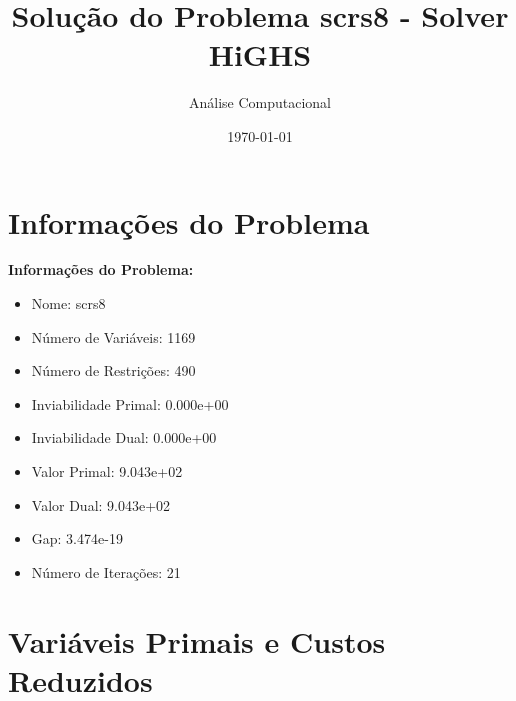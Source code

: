 \documentclass[12pt]{article}
\title{Solução do Problema scrs8 - Solver HiGHS}
\author{Análise Computacional}
\date{\today}
\begin{document}
\maketitle

\section{Informações do Problema}

\textbf{Informações do Problema:}
\begin{itemize}
\item Nome: scrs8
\item Número de Variáveis: 1169
\item Número de Restrições: 490
\item Inviabilidade Primal: 0.000e+00
\item Inviabilidade Dual: 0.000e+00
\item Valor Primal: 9.043e+02
\item Valor Dual: 9.043e+02
\item Gap: 3.474e-19
\item Número de Iterações: 21
\end{itemize}


\section{Variáveis Primais e Custos Reduzidos}
\end{document}
